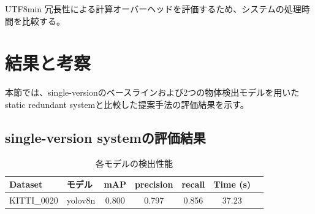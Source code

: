 \documentclass[conference, dvipdfmx]{IEEEtran}
\begin{document}
\begin{CJK}{UTF8}{min}
冗長性による計算オーバーヘッドを評価するため、システムの処理時間を比較する。

\section{結果と考察}
\label{sec: results and discussion}
本節では、single-versionのベースラインおよび2つの物体検出モデルを用いたstatic redundant systemと比較した提案手法の評価結果を示す。

\subsection{single-version systemの評価結果}

\begin{table}[t]
  \centering
  \caption{各モデルの検出性能}
  \label{tab:baseline}
  \begin{tabular}{llccccc}
    \toprule
    Dataset
    & モデル      & mAP   & precision & recall & Time (s) \\
    \midrule
    \multirow{7}{*}{KITTI\_0020}
    & yolov8n    & 0.800 & 0.797     & 0.856  & 37.23 \\

\end{tabular}
\end{table}
\end{CJK}
\end{document}
